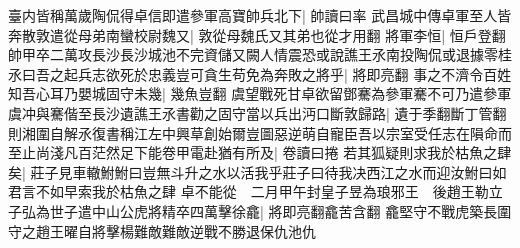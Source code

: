 臺内皆稱萬歲陶侃得卓信即遣參軍高寶帥兵北下|{
	帥讀曰率}
武昌城中傳卓軍至人皆奔散敦遣從母弟南蠻校尉魏又|{
	敦從母魏氏又其弟也從才用翻}
將軍李恒|{
	恒戶登翻}
帥甲卒二萬攻長沙長沙城池不完資儲又闕人情震恐或說譙王氶南投陶侃或退據零桂氶曰吾之起兵志欲死於忠義豈可貪生苟免為奔敗之將乎|{
	將即亮翻}
事之不濟令百姓知吾心耳乃嬰城固守未幾|{
	幾魚豈翻}
虞望戰死甘卓欲留鄧騫為參軍騫不可乃遣參軍虞冲與騫偕至長沙遺譙王氶書勸之固守當以兵出沔口斷敦歸路|{
	遺于季翻斷丁管翻}
則湘圍自解氶復書稱江左中興草創始爾豈圖惡逆萌自寵臣吾以宗室受任志在隕命而至止尚淺凡百茫然足下能卷甲電赴猶有所及|{
	卷讀曰捲}
若其狐疑則求我於枯魚之肆矣|{
	莊子見車轍鮒鮒曰豈無斗升之水以活我乎莊子曰待我决西江之水而迎汝鮒曰如君言不如早索我於枯魚之肆}
卓不能從　二月甲午封皇子昱為琅邪王　後趙王勒立子弘為世子遣中山公虎將精卒四萬擊徐龕|{
	將即亮翻龕苦含翻}
龕堅守不戰虎築長圍守之趙王曜自將擊楊難敵難敵逆戰不勝退保仇池仇


